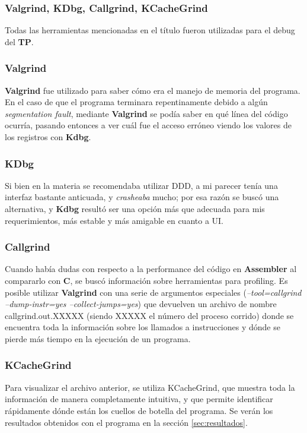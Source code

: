 \subsubsection{Valgrind, KDbg, Callgrind, KCacheGrind}
Todas las herramientas mencionadas en el título fueron utilizadas para el debug del \textbf{TP}.

\subsubsection*{Valgrind}
\textbf{Valgrind} fue utilizado para saber cómo era el manejo de memoria del programa. En el caso de que el programa terminara repentinamente debido a algún \textit{segmentation fault}, mediante \textbf{Valgrind} se podía saber en qué línea del código ocurría, pasando entonces a ver cuál fue el acceso erróneo viendo los valores de los registros con \textbf{Kdbg}. 

\subsubsection*{KDbg}
Si bien en la materia se recomendaba utilizar DDD, a mi parecer tenía una interfaz bastante anticuada, y \textit{crasheaba} mucho; por esa razón se buscó una alternativa, y \textbf{Kdbg} resultó ser una opción más que adecuada para mis requerimientos, más estable y más amigable en cuanto a UI.

\subsubsection*{Callgrind}
\label{subsec:callgrind}
Cuando había dudas con respecto a la performance del código en \textbf{Assembler} al compararlo con \textbf{C}, se buscó información sobre herramientas para profiling. Es posible utilizar \textbf{Valgrind} con una serie de argumentos especiales (\textit{--tool=callgrind --dump-instr=yes --collect-jumps=yes}) que devuelven un archivo de nombre callgrind.out.XXXXX (siendo XXXXX el número del proceso corrido) donde se encuentra toda la información sobre los llamados a instrucciones y dónde se pierde más tiempo en la ejecución de un programa.

\subsubsection*{KCacheGrind}
Para visualizar el archivo anterior, se utiliza KCacheGrind, que muestra toda la información de manera completamente intuitiva, y que permite identificar rápidamente dónde están los cuellos de botella del programa. Se verán los resultados obtenidos con el programa en la sección \ref{sec:resultados}.
